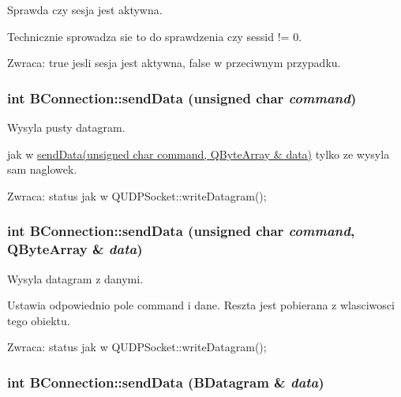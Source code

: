 Sprawda czy sesja jest aktywna. 

Technicznie sprowadza sie to do sprawdzenia czy sessid != 0.

\begin{Desc}
\item[Zwraca:]true jesli sesja jest aktywna, false w przeciwnym przypadku. \end{Desc}
\hypertarget{class_b_connection_e6e720ac6a03bd3672ab440eb1e9b8c5}{
\subsubsection[{sendData}]{\setlength{\rightskip}{0pt plus 5cm}int BConnection::sendData (unsigned char {\em command})}}
\label{class_b_connection_e6e720ac6a03bd3672ab440eb1e9b8c5}


Wysyla pusty datagram. 

jak w \hyperlink{class_b_connection_77f411c1ec683bd571f41023609f2e7f}{sendData(unsigned char command, QByteArray \& data)} tylko ze wysyla sam naglowek.

\begin{Desc}
\item[Zwraca:]status jak w QUDPSocket::writeDatagram(); \end{Desc}
\hypertarget{class_b_connection_77f411c1ec683bd571f41023609f2e7f}{
\subsubsection[{sendData}]{\setlength{\rightskip}{0pt plus 5cm}int BConnection::sendData (unsigned char {\em command}, \/  QByteArray \& {\em data})}}
\label{class_b_connection_77f411c1ec683bd571f41023609f2e7f}


Wysyla datagram z danymi. 

Ustawia odpowiednio pole command i dane. Reszta jest pobierana z wlasciwosci tego obiektu.

\begin{Desc}
\item[Zwraca:]status jak w QUDPSocket::writeDatagram(); \end{Desc}
\hypertarget{class_b_connection_53b6835b9124709e108913103049910b}{
\subsubsection[{sendData}]{\setlength{\rightskip}{0pt plus 5cm}int BConnection::sendData ({\bf BDatagram} \& {\em data})}}
\label{class_b_connection_53b6835b9124709e108913103049910b}


